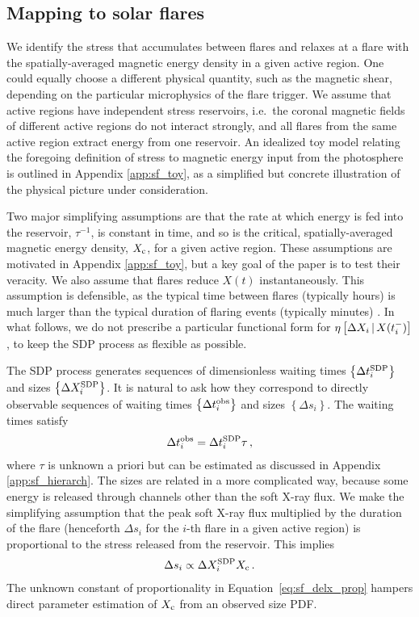 \subsection{Mapping to solar flares} \label{sec:sf_map}
We identify the stress that accumulates between flares and relaxes at a flare with the spatially-averaged magnetic energy density in a given active region. One could equally choose a different physical quantity, such as the magnetic shear, depending on the particular microphysics of the flare trigger. We assume that active regions have independent stress reservoirs, i.e.~the coronal magnetic fields of different active regions do not interact strongly, and all flares from the same active region extract energy from one reservoir. An idealized toy model relating the foregoing definition of stress to magnetic energy input from the photosphere is outlined in Appendix \ref{app:sf_toy}, as a simplified but concrete illustration of the physical picture under consideration. 

Two major simplifying assumptions are that the rate at which energy is fed into the reservoir, $\tau^{-1}$, is constant in time, and so is the critical, spatially-averaged magnetic energy density, $X_\textrm{c}$, for a given active region. These assumptions are motivated in Appendix \ref{app:sf_toy}, but a key goal of the paper is to test their veracity. We also assume that flares reduce $X(t)$ instantaneously. This assumption is defensible, as the typical time between flares (typically hours) is much larger than the typical duration of flaring events (typically minutes) \citep{Fletcher2011}. In what follows, we do not prescribe a particular functional form for $\eta\left[\Delta X_{i}\,|\,X(t_i^-)\right]$, to keep the SDP process as flexible as possible. 

The SDP process generates sequences of dimensionless waiting times $\left\{\Delta t_{i}^{\rm SDP}\right\}$ and sizes $\left\{\Delta X_{i}^{\rm SDP}\right\}$. It is natural to ask how they correspond to directly observable sequences of waiting times $\left\{\Delta t_{i}^{\rm obs}\right\}$ and sizes $\left\{\Delta s_{i}\right\}$. The waiting times satisfy
\begin{eqnarray}
{\Delta t_{i}^{\rm obs} = \Delta t_{i}^{\rm SDP} \tau}\,,\label{eq:sf_delt_prop}
\end{eqnarray}
where $\tau$ is unknown a priori but can be estimated as discussed in Appendix \ref{app:sf_hierarch}. The sizes are related in a more complicated way, because some energy is released through channels other than the soft X-ray flux. We make the simplifying assumption that the peak soft X-ray flux multiplied by the duration of the flare (henceforth $\Delta s_{i}$ for the $i$-th flare in a given active region) is proportional to the stress released from the reservoir. This implies
\begin{eqnarray}
{\Delta s_{i} \propto \Delta X_{i}^{\rm SDP} X_\textrm{c}}\,.\label{eq:sf_delx_prop}
\end{eqnarray}
The unknown constant of proportionality in Equation~\eqref{eq:sf_delx_prop} hampers direct parameter estimation of $X_\textrm{c}$ from an observed size PDF. 

